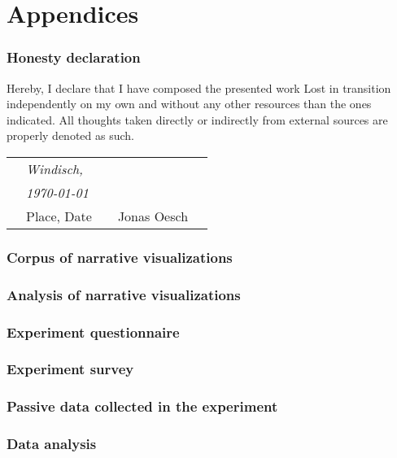 \newpage
\appendix
\part{Appendices}

\section{Honesty declaration}
Hereby, I declare that I have composed the presented work Lost in transition independently on my own and without any other resources than the ones indicated. All thoughts taken directly or indirectly from external sources are properly denoted as such.
\vspace{3cm}

\centering
\begin{tabular}{p{10mm}>{\centering\arraybackslash}p{50mm}p{10mm}
>{\centering\arraybackslash}p{50mm}p{10mm}}
&\textit{\large Windisch,}&&& \\
&\textit{\large  \today}&&\hrulefill& \\
&\small Place, Date&&\small Jonas Oesch&
\end{tabular}

\newpage
\section{Corpus of narrative visualizations} \label{appendix-corpus}

\section{Analysis of narrative visualizations} \label{appendix-transition-analysis}

\section{Experiment questionnaire} \label{appendix-questionnaire}

\section{Experiment survey} \label{appendix-survey}

\section{Passive data collected in the experiment} \label{appendix-passivedata}

\section{Data analysis} \label{appendix-dataanalysis}
